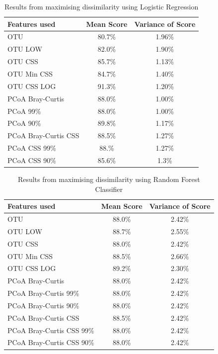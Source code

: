 \begin{table}[h]
\caption{Results from maximising dissimilarity using Logistic Regression}
\centering
\label{table:lrdissimilarity}
\begin{tabular}{l c  c}
\hline 
Features used & Mean Score & Variance of Score \\ 
 
\hline
OTU & 80.7\% & 1.96\%   \\
OTU LOW &82.0\%&1.90\%\\
OTU CSS & 85.7\% & 1.13\%   \\
OTU Min CSS & 84.7\% & 1.40\%   \\
OTU CSS LOG& 91.3\% &1.20\%\\
PCoA Bray-Curtis &88.0\% & 1.00\%   \\
PCoA 99\%&        88.0\%&1.00\%\\
PCoA 90\% &      89.8\%&1.17\%\\
PCoA Bray-Curtis CSS &88.5\% & 1.27\%   \\
PCoA CSS 99\% &   88.\%&1.27\%\\
PCoA CSS 90\%&    85.6\%&1.3\%\\

\hline 
\end{tabular}
\end{table} 

\begin{table}[h]
	\caption{Results from maximising dissimilarity using Random Forest Classifier}
	\centering
	\label{table:rfrdissimilarity}
	\begin{tabular}{l c  c}
		\hline 
		Features used & Mean Score & Variance of Score \\ 
		
		\hline
		OTU & 88.0\% & 2.42\%   \\
		OTU LOW &88.7\%&2.55\%\\
		OTU CSS & 88.0\% & 2.42\%   \\
		OTU Min CSS & 88.5\% & 2.66\%   \\
		OTU CSS LOG & 89.2\%&	2.30\%\\
		PCoA Bray-Curtis &88.0\% & 2.42\%   \\
		PCoA Bray-Curtis 99\% &88.0\% & 2.42\%   \\
		PCoA Bray-Curtis 90\%&88.0\% & 2.42\%   \\
		PCoA Bray-Curtis CSS &88.5\% & 2.42\%   \\
		PCoA Bray-Curtis CSS 99\%&88.0\% & 2.42\%   \\
		PCoA Bray-Curtis CSS 90\%&88.0\% & 2.42\%   \\		
		\hline 
	\end{tabular}
\end{table} 



